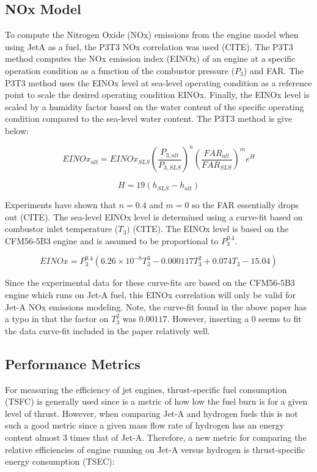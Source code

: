 \documentclass[12pt]{article}
\begin{document}
\subsection{NOx Model}
To compute the Nitrogen Oxide (NOx) emissions from the engine model when using JetA as a fuel, the P3T3 NOx correlation was used (CITE).
The P3T3 method computes the NOx emission index (EINOx) of an engine at a specific operation condition as a function of the combustor pressure ($P_3$) and FAR.
The P3T3 method uses the EINOx level at sea-level operating condition as a reference point to scale the desired operating condition EINOx.
Finally, the EINOx level is scaled by a humidity factor based on the water content of the specific operating condition compared to the sea-level water content.
The P3T3 method is give below:

\begin{equation}
    EINOx_{alt} = EINOx_{SLS} \left(\frac{P_{3,alt}}{P_{3,SLS}}\right)^n \left(\frac{FAR_{alt}}{FAR_{SLS}}\right)^m e^{H}
\end{equation}

\begin{equation}
    H = 19 (h_{SLS} - h_{alt})
\end{equation}

\noindent
Experiments have shown that $n=0.4$ and $m=0$ so the FAR essentially drops out (CITE).
The sea-level EINOx level is determined using a curve-fit based on combustor inlet temperature ($T_3)$ (CITE).
The EINOx level is based on the CFM56-5B3 engine and is assumed to be proportional to $P_3^{0.4}$.

\begin{equation}
    EINOx = P_3^{0.4} (6.26 \times 10^{-8}T_3^3 - 0.000117 T_3^2 + 0.074 T_3 - 15.04)
\end{equation}

\noindent
Since the experimental data for these curve-fits are based on the CFM56-5B3 engine which runs on Jet-A fuel, this EINOx correlation will only be valid for Jet-A NOx emissions modeling.
Note, the curve-fit found in the above paper has a typo in that the factor on $T_3^2$ was $0.00117$.
However, inserting a 0 seems to fit the data curve-fit included in the paper relatively well.

\subsection{Performance Metrics}
For measuring the efficiency of jet engines, thrust-specific fuel consumption (TSFC) is generally used since is a metric of how low the fuel burn is for a given level of thrust.
However, when comparing Jet-A and hydrogen fuels this is not such a good metric since a given mass flow rate of hydrogen has an energy content almost 3 times that of Jet-A.
Therefore, a new metric for comparing the relative efficiencies of engine running on Jet-A versus hydrogen is thrust-specific energy consumption (TSEC):
\end{document}
